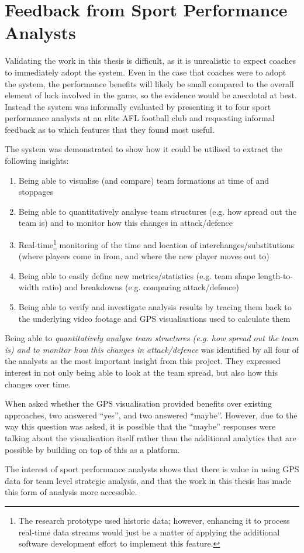 \section{Feedback from Sport Performance Analysts}
\label{ch:eval}

Validating the work in this thesis is difficult, as it is unrealistic to expect coaches to immediately adopt the system. Even in the case that coaches were to adopt the system, the performance benefits will likely be small compared to the overall element of luck involved in the game, so the evidence would be anecdotal at best. Instead the system was informally evaluated by presenting it to four sport performance analysts at an elite AFL football club and requesting informal feedback as to which features that they found most useful.

The system was demonstrated to show how it could be utilised to extract the following insights:

\begin{enumerate}
  \item Being able to visualise (and compare) team formations at time of \centrebounces{} and stoppages
  \item Being able to quantitatively analyse team structures (e.g. how spread out the team is) and to monitor how this changes in attack/defence
  \item Real-time\footnote{The research prototype used historic data; however, enhancing it to process real-time data streams would just be a matter of applying the additional software development effort to implement this feature.} monitoring of the time and location of interchanges/substitutions (where players come in from, and where the new player moves out to)
  \item Being able to easily define new metrics/statistics (e.g. team shape length-to-width ratio) and breakdowns (e.g. comparing attack/defence) %
  \item Being able to verify and investigate analysis results by tracing them back to the underlying video footage and GPS visualisations used to calculate them
\end{enumerate}

Being able to \textit{quantitatively analyse team structures (e.g. how spread out the team is) and to monitor how this changes in attack/defence} was identified by all four of the analysts as the most important insight from this project. They expressed interest in not only being able to look at the team spread, but also how this changes over time.

When asked whether the GPS visualisation provided benefits over existing approaches, two answered ``yes'', and two answered ``maybe''. However, due to the way this question was asked, it is possible that the ``maybe'' responses were talking about the visualisation itself rather than the additional analytics that are possible by building on top of this as a platform.

The interest of sport performance analysts shows that there is value in using GPS data for team level strategic analysis, and that the work in this thesis has made this form of analysis more accessible.

